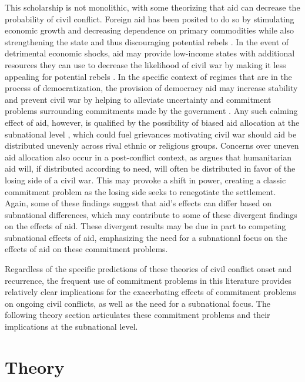 \documentclass[12pt, letterpaper]{article}
\renewcommand{\cite}{\citep}
\begin{document}
This scholarship is not monolithic, with some theorizing that aid can decrease the probability of civil conflict. Foreign aid has been posited to do so by stimulating economic growth and decreasing dependence on primary commodities \cite{collier2002aid, collierhoeffler2004} while also strengthening the state and thus discouraging potential rebels \cite{collier2011wars}. In the event of detrimental economic shocks, aid may provide low-income states with additional resources they can use to decrease the likelihood of civil war by making it less appealing for potential rebels \cite{savun_tirone_2012}. In the specific context of regimes that are in the process of democratization, the provision of democracy aid may increase stability and prevent civil war by helping to alleviate uncertainty and commitment problems surrounding commitments made by the government \cite{savuntirone2011}. Any such calming effect of aid, however, is qualified by the possibility of biased aid allocation at the subnational level \cite{jablonski2014}, which could fuel grievances motivating civil war should aid be distributed unevenly across rival ethnic or religious groups. Concerns over uneven aid allocation also occur in a post-conflict context, as \citet{narang2014humanitarian} argues that humanitarian aid will, if distributed according to need, will often be distributed in favor of the losing side of a civil war. This may provoke a shift in power, creating a classic commitment problem as the losing side seeks to renegotiate the settlement. Again, some of these findings suggest that aid’s effects can differ based on subnational differences, which may contribute to some of these divergent findings on the effects of aid. These divergent results may be due in part to competing subnational effects of aid, emphasizing the need for a subnational focus on the effects of aid on these commitment problems.

Regardless of the specific predictions of these theories of civil conflict onset and recurrence, the frequent use of commitment problems in this literature provides relatively clear implications for the exacerbating effects of commitment problems on ongoing civil conflicts, as well as the need for a subnational focus. The following theory section articulates these commitment problems and their implications at the subnational level.

\section{Theory}
\end{document}
